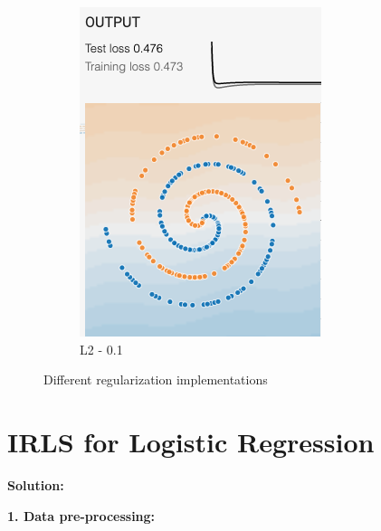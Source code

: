 \documentclass[12pt,a4paper]{article}
\begin{document}
\begin{enumerate}
\begin{figure}[H]
\begin{subfigure}[H]{0.2\textwidth}
				\includegraphics[width=\textwidth]{Figures/reg/L201}
				\caption{L2 - 0.1}
			\end{subfigure}
			\vspace{-0.1cm}
			\caption{Different regularization implementations}
		\end{figure}
		\vspace{-0.5cm}
		
	\end{enumerate}
	
	\newpage
	\section{IRLS for Logistic Regression}
	
	\noindent \textbf{Solution:}
	\vspace{0.2cm}
	
	\noindent \textbf{1. Data pre-processing:}
	\vspace{0.2cm}
	
\end{document}
